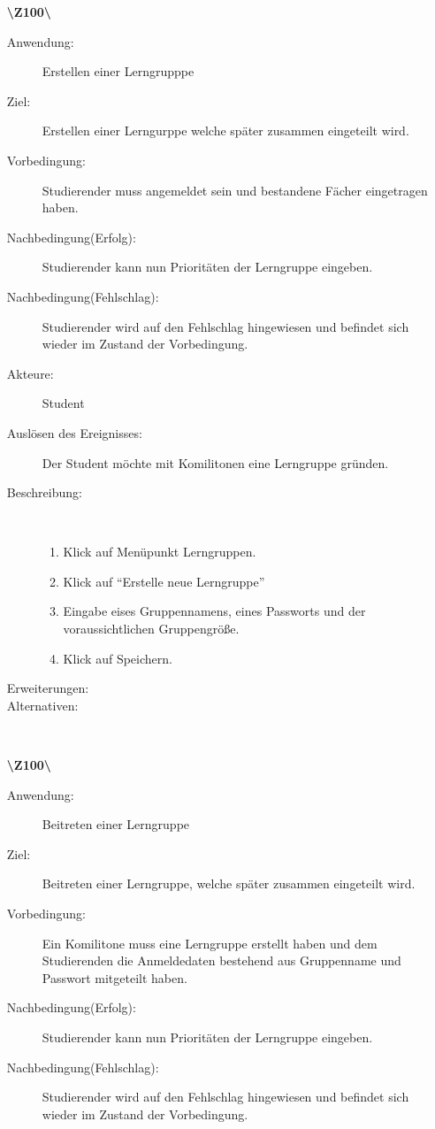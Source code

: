 \documentclass[a4paper]{article}
\begin{document}
\begin{enumerate}
  
      \item[\textbf{\textbackslash Z100\textbackslash}] \begin{description}
    \item[Anwendung:] Erstellen einer Lerngrupppe
    \item[Ziel:] Erstellen einer Lerngurppe welche später zusammen eingeteilt
    wird.
    \item[Vorbedingung:] Studierender muss angemeldet sein und bestandene Fächer
    eingetragen haben.
    \item[Nachbedingung(Erfolg):] Studierender kann nun Prioritäten der
    Lerngruppe eingeben.
    \item[Nachbedingung(Fehlschlag):] Studierender wird auf den Fehlschlag
    hingewiesen und befindet sich wieder im Zustand der Vorbedingung.
    
    \item[Akteure:] Student
    \item[Auslösen des Ereignisses:]Der Student möchte mit Komilitonen eine
    Lerngruppe gründen.
    \item[Beschreibung:]~
    \begin{enumerate}[1.]
      \item Klick auf Menüpunkt Lerngruppen.
      \item Klick auf "`Erstelle neue Lerngruppe"'
      \item Eingabe eises Gruppennamens, eines Passworts und der
      voraussichtlichen Gruppengröße.
      \item Klick auf Speichern.
      
    \end{enumerate}
    \item[Erweiterungen:]
    \item[Alternativen:]~
      \end{description}
  \pagebreak
  
    \item[\textbf{\textbackslash Z100\textbackslash}] \begin{description}
    \item[Anwendung:] Beitreten einer Lerngruppe
    \item[Ziel:] Beitreten einer Lerngruppe, welche später zusammen eingeteilt
    wird.
    \item[Vorbedingung:] Ein Komilitone muss eine Lerngruppe erstellt haben und
    dem Studierenden die Anmeldedaten bestehend aus Gruppenname und Passwort
    mitgeteilt haben.
    \item[Nachbedingung(Erfolg):] Studierender kann nun Prioritäten der
    Lerngruppe eingeben.
    \item[Nachbedingung(Fehlschlag):] Studierender wird auf den Fehlschlag
    hingewiesen und befindet sich wieder im Zustand der Vorbedingung.
    

\end{description}
\end{enumerate}
\end{document}

